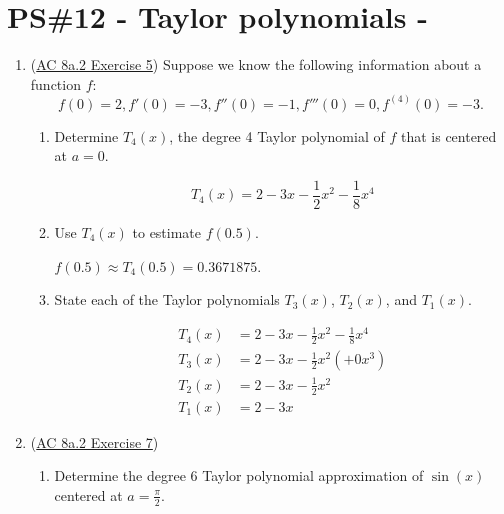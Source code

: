 


%


\allowdisplaybreaks
\section{PS\#12 - Taylor polynomials -  }

\everymath{\displaystyle}
\begin{enumerate}[leftmargin=0pt]

\item (\href{https://faculty.gvsu.edu/boelkinm/Home/ACS/sec-8a-2-taylor-poly.html#ez-8a-2-0}{AC 8a.2 Exercise 5}) Suppose we know the following information about a function $f$:
\begin{equation*}
f(0) = 2, f'(0) = -3, f''(0) = -1, f'''(0) = 0, f^{(4)}(0) = -3\text{.}
\end{equation*}
\begin{enumerate}
    \item Determine $T_4(x)$, the degree 4 Taylor polynomial of $f$ that is centered at $a=0$.    \begin{red}
    \[T_4(x)=2 - 3x - \frac12 x^2 - \frac18 x^4\]
    \end{red}
    \item Use $T_4(x)$ to estimate $f(0.5)$.
    \begin{red}
    $f(0.5) \approx T_4(0.5) = 0.3671875.$
    \end{red}
    
    \item State each of the Taylor polynomials $T_3(x)$, $T_2(x)$, and $T_1(x)$.
    \begin{red}
    \begin{align*}
        T_4(x) &= 2 - 3x - \frac12 x^2 - \frac18 x^4 \\
        T_3(x) &= 2 - 3x - \frac12 x^2 (+0x^3) \\
        T_2(x) &= 2 - 3x - \frac12 x^2 \\
        T_1(x) &= 2 - 3x
    \end{align*}
    \end{red}
\end{enumerate}

\item (\href{https://faculty.gvsu.edu/boelkinm/Home/ACS/sec-8a-2-taylor-poly.html#ez-8a-2-2}{AC 8a.2 Exercise 7}) 
\begin{enumerate}
    \item Determine the degree 6 Taylor polynomial approximation of $\sin(x)$ centered at $a=\tfrac\pi2$.
    

\end{enumerate}
\end{enumerate}
